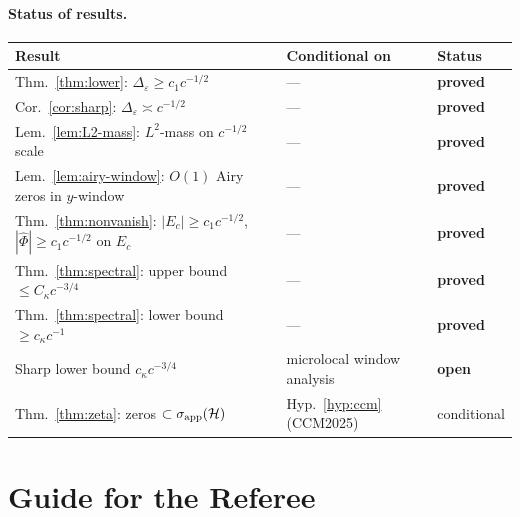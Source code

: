 \documentclass[12pt,a4paper]{amsart}
\theoremstyle{definition}
\theoremstyle{remark}
\newcommand{\Phihat}{\widehat{\Phi}}
\newcommand{\Hlim}{\mathcal{H}}
\begin{document}
\paragraph{Status of results.}
\begin{center}
\renewcommand{\arraystretch}{1.4}
\begin{tabular}{lll}
\toprule
Result & Conditional on & Status\\
\midrule
Thm.~\ref{thm:lower}: $\Delta_\varepsilon \ge c_1 c^{-1/2}$
  & --- & \textbf{proved}\\
Cor.~\ref{cor:sharp}: $\Delta_\varepsilon \asymp c^{-1/2}$
  & --- & \textbf{proved}\\
Lem.~\ref{lem:L2-mass}: $L^2$-mass on $c^{-1/2}$ scale
  & --- & \textbf{proved}\\
Lem.~\ref{lem:airy-window}: $O(1)$ Airy zeros in $y$-window
  & --- & \textbf{proved}\\
Thm.~\ref{thm:nonvanish}: $|E_c|\ge c_1 c^{-1/2}$,
  $|\Phihat|\ge c_1 c^{-1/2}$ on $E_c$
  & --- & \textbf{proved}\\
Thm.~\ref{thm:spectral}: upper bound $\le C_\kappa c^{-3/4}$
  & --- & \textbf{proved}\\
Thm.~\ref{thm:spectral}: lower bound $\ge c_\kappa c^{-1}$
  & --- & \textbf{proved}\\
Sharp lower bound $c_\kappa c^{-3/4}$
  & microlocal window analysis & \textbf{open}\\
Thm.~\ref{thm:zeta}: zeros $\subset\sigma_{\rm app}(\Hlim)$
  & Hyp.~\ref{hyp:ccm} (CCM2025) & conditional\\
\bottomrule
\end{tabular}
\end{center}

\maketitle

\section*{Guide for the Referee}
\end{document}
